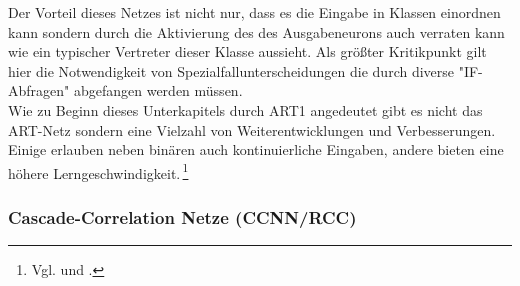 Der Vorteil dieses Netzes ist nicht nur, dass es die Eingabe in Klassen einordnen kann sondern durch die Aktivierung des des Ausgabeneurons auch verraten kann wie ein typischer Vertreter dieser Klasse aussieht. Als größter Kritikpunkt gilt hier die Notwendigkeit von Spezialfallunterscheidungen die durch diverse "IF-Abfragen" abgefangen werden müssen.\,\\
Wie zu Beginn dieses Unterkapitels durch ART1 angedeutet gibt es nicht das ART-Netz sondern eine Vielzahl von Weiterentwicklungen und Verbesserungen. Einige erlauben neben binären auch kontinuierliche Eingaben, andere bieten eine höhere Lerngeschwindigkeit.\,\footnote{Vgl. \citet[C2.2:1 ff]{Fiesler96} und \citet[89 ff]{Gurney1997}.} 



\subsubsection{Cascade-Correlation Netze (CCNN/RCC)}%

